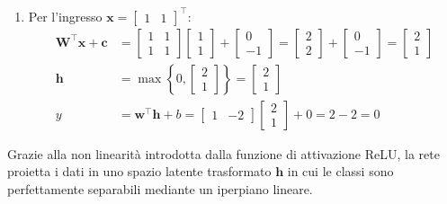 ﻿\documentclass[11pt, a4paper]{article}
\begin{document}
\begin{enumerate}
    \item Per l'ingresso $\bm{x} = \begin{bmatrix} 1 & 1 \end{bmatrix}^\top$:
    \begin{align*}
    \bm{W}^\top \bm{x} + \bm{c} &= \begin{bmatrix} 1 & 1 \\ 1 & 1 \end{bmatrix} \begin{bmatrix} 1 \\ 1 \end{bmatrix} + \begin{bmatrix} 0 \\ -1 \end{bmatrix} = \begin{bmatrix} 2 \\ 2 \end{bmatrix} + \begin{bmatrix} 0 \\ -1 \end{bmatrix} = \begin{bmatrix} 2 \\ 1 \end{bmatrix} \\
    \bm{h} &= \max\left\{0, \begin{bmatrix} 2 \\ 1 \end{bmatrix}\right\} = \begin{bmatrix} 2 \\ 1 \end{bmatrix} \\
    y &= \bm{w}^\top \bm{h} + b = \begin{bmatrix} 1 & -2 \end{bmatrix} \begin{bmatrix} 2 \\ 1 \end{bmatrix} + 0 = 2 - 2 = \boxed{0}
    \end{align*}
\end{enumerate}

Grazie alla non linearità introdotta dalla funzione di attivazione ReLU, la rete proietta i dati in uno spazio latente trasformato $\bm{h}$ in cui le classi sono perfettamente separabili mediante un iperpiano lineare.

\end{document}
